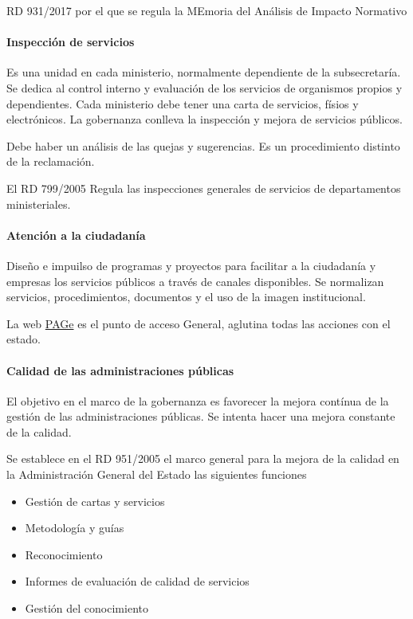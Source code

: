         RD 931/2017 por el que se regula la MEmoria del Análisis de Impacto Normativo

    \paragraph{Inspección de servicios}
        Es una unidad en cada ministerio, normalmente dependiente de la subsecretaría. Se dedica al control interno y evaluación de los servicios de organismos propios y dependientes. Cada ministerio debe tener una carta de servicios, físios y electrónicos. La gobernanza conlleva la inspección y mejora de servicios públicos.

        Debe haber un análisis de las quejas y sugerencias. Es un procedimiento distinto de la reclamación.

        El RD 799/2005 Regula las inspecciones generales de servicios de departamentos ministeriales.

    \paragraph{Atención a la ciudadanía}
        Diseño e impuilso de programas y proyectos para facilitar a la ciudadanía y empresas los servicios públicos a través de canales disponibles. Se normalizan servicios, procedimientos, documentos y el uso de la imagen institucional.

        La web \href{www.administracion.gob.es}{PAGe} es el punto de acceso General, aglutina todas las acciones con el estado.

    \paragraph{Calidad de las administraciones públicas}
        El objetivo en el marco de la gobernanza es favorecer la mejora contínua de la gestión de las administraciones públicas. Se intenta hacer una mejora constante de la calidad.

        Se establece en el RD 951/2005 el marco general para la mejora de la calidad en la Administración General del Estado las siguientes funciones

        \begin{itemize}
            \item Gestión de cartas y servicios
            \item Metodología y guías
            \item Reconocimiento
            \item Informes de evaluación de calidad de servicios
            \item Gestión del conocimiento
        \end{itemize}

